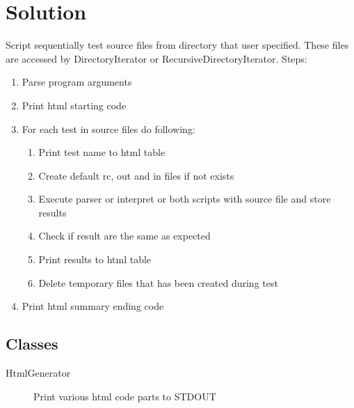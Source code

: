 \documentclass[10pt, a4paper]{article}
\begin{document}
\section*{Solution}

Script sequentially test source files from directory that user specified. These files are accessed by DirectoryIterator or RecursiveDirectoryIterator.
Steps:
\begin{enumerate}[itemsep=0mm]
	\item Parse program arguments
	\item Print html starting code
	\item For each test in source files do following:
	\begin{enumerate}[itemsep=0mm]
		\item Print test name to html table
		\item Create default rc, out and in files if not exists
		\item Execute parser or interpret or both scripts with source file and store results
		\item Check if result are the same as expected
		\item Print results to html table
		\item Delete temporary files that has been created during test
	\end{enumerate}
	\item Print html summary ending code
\end{enumerate}


\subsection*{Classes}
\begin{adjustwidth}{0.5cm}{}
\begin{description}
	\item[HtmlGenerator]Print various html code parts to STDOUT	
\end{description}

 
\end{adjustwidth} 
\end{document}
